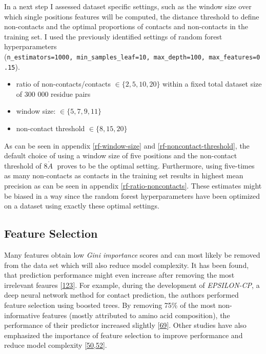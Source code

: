 \documentclass[12pt,a4paper,twoside]{book}
\providecommand{\tightlist}{%
  \setlength{\itemsep}{0pt}\setlength{\parskip}{0pt}}
\newcommand{\angstrom}{\mathring{A} \;}
\theoremstyle{definition}
\theoremstyle{definition}
\theoremstyle{remark}
\begin{document}
In a next step I assessed dataset specific settings, such as the window
size over which single positions features will be computed, the distance
threshold to define non-contacts and the optimal proportions of contacts
and non-contacts in the training set. I used the previously identified
settings of random forest hyperparameters
(\texttt{n\_estimators=1000,\ min\_samples\_leaf=10,\ max\_depth=100,\ max\_features=0.15}).

\begin{itemize}
\tightlist
\item
  ratio of non-contacts/contacts \(\in \{2, 5, 10, 20 \}\) within a
  fixed total dataset size of 300 000 residue pairs
\item
  window size: \(\in \{5, 7, 9, 11\}\)
\item
  non-contact threshold \(\in \{8, 15, 20\}\)
\end{itemize}

As can be seen in appendix \ref{rf-window-size} and
\ref{rf-noncontact-threshold}, the default choice of using a window size
of five positions and the non-contact threshold of \(8 \angstrom\)
proves to be the optimal setting. Furthermore, using five-times as many
non-contacts as contacts in the training set results in highest mean
precision as can be seen in appendix \ref{rf-ratio-noncontacts}. These
estimates might be biased in a way since the random forest
hyperparameters have been optimized on a dataset using exactly these
optimal settings.

\subsection{Feature Selection}\label{rf-feature-selection}

Many features obtain low \emph{Gini importance} scores and can most
likely be removed from the data set which will also reduce model
complexity. It has been found, that prediction performance might even
increase after removing the most irrelevant feaures
{[}\protect\hyperlink{ref-Menze2009}{123}{]}. For example, during the
development of \emph{EPSILON-CP}, a deep neural network method for
contact prediction, the authors performed feature selection using
boosted trees. By removing 75\% of the most non-informative features
(mostly attributed to amino acid composition), the performance of their
predictor increased slightly
{[}\protect\hyperlink{ref-Stahl2017}{69}{]}. Other studies have also
emphasized the importance of feature selection to improve performance
and reduce model complexity
{[}\protect\hyperlink{ref-Cheng2007}{50},\protect\hyperlink{ref-Li2011}{52}{]}.
\end{document}
